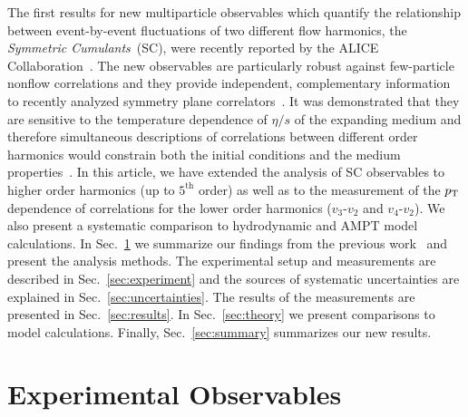 The first results for new multiparticle observables which quantify the relationship between event-by-event fluctuations of two different flow harmonics, the \textit{Symmetric Cumulants}~(SC), were recently reported by the ALICE Collaboration~\cite{ALICE:2016kpq}.
The new observables are particularly robust against few-particle nonflow correlations and they provide independent, complementary information to recently analyzed symmetry plane correlators~\cite{Aad:2014fla}. 
It was demonstrated that they are sensitive to the temperature dependence of $\eta/s$ of the expanding medium and therefore simultaneous descriptions of correlations between different order harmonics would constrain both the initial conditions and the medium properties~\cite{ALICE:2016kpq,Zhu:2016puf}.
In this article, we have extended the analysis of SC observables to higher order harmonics (up to $5^{\mathrm{th}}$ order) as well as to the measurement of the $p_{\rm T}$ dependence of correlations for the lower order harmonics ($v_3$-$v_2$ and $v_4$-$v_2$).  We also present a systematic comparison to hydrodynamic and AMPT model calculations.
In Sec.~\ref{sec:method} we summarize our findings from the previous work~\cite{ALICE:2016kpq} and present the analysis methods. The experimental setup and measurements are described in Sec.~\ref{sec:experiment} and the sources of systematic uncertainties are explained in Sec.~\ref{sec:uncertainties}. The results of the measurements are presented in Sec.~\ref{sec:results}. In Sec.~\ref{sec:theory} we present comparisons to model calculations.
Finally, Sec.~\ref{sec:summary} summarizes our new results.
 
\section{Experimental Observables}
\label{sec:method}

